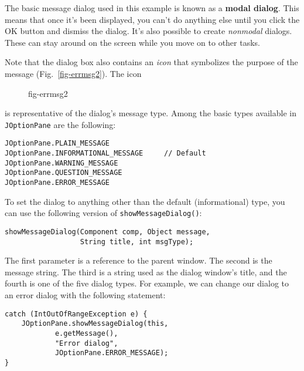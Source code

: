 The basic message dialog used in this example is known as a
{\bf modal dialog}. This means that once it's been displayed, you
can't do anything else until you click the OK button and
dismiss the dialog.  It's also possible to create {\it nonmodal}
dialogs.  These can stay around on the screen while you move on to
other tasks.

Note that the dialog box also contains an {\it icon} that symbolizes
the purpose of the message (Fig.~\ref{fig-errmsg2}). The icon
\begin{figure}[h]
{fig-errmsg2}
\end{figure}
is representative of the dialog's message type.  Among the basic
types available in {\tt JOptionPane} are the following:

\begin{jjjlisting}
\begin{lstlisting}
JOptionPane.PLAIN_MESSAGE
JOptionPane.INFORMATIONAL_MESSAGE     // Default
JOptionPane.WARNING_MESSAGE
JOptionPane.QUESTION_MESSAGE
JOptionPane.ERROR_MESSAGE
\end{lstlisting}
\end{jjjlisting}

\noindent To set the dialog to anything other than the default
(informational) type, you can use the following version of
{\tt showMessageDialog()}:

\begin{jjjlisting}
\begin{lstlisting}
showMessageDialog(Component comp, Object message, 
                  String title, int msgType);
\end{lstlisting}
\end{jjjlisting}

\noindent The first parameter is a reference to the parent window.
The second is the message string.  The third is a string used as the
dialog window's title, and the fourth is one of the five dialog types.
For example, we can change our dialog to an error dialog with the
following statement:



\begin{jjjlisting}
\begin{lstlisting}
catch (IntOutOfRangeException e) {
    JOptionPane.showMessageDialog(this,
            e.getMessage(),
            "Error dialog",
            JOptionPane.ERROR_MESSAGE);
}
\end{lstlisting}
\end{jjjlisting}

